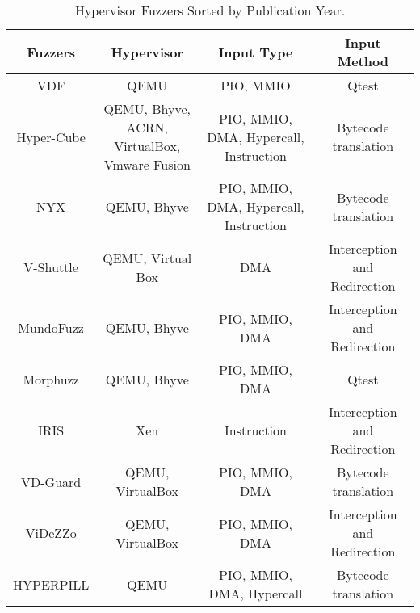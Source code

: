\begin{table}
    \centering
    \scriptsize %
    \caption{Hypervisor Fuzzers Sorted by Publication Year.}
    \label{tab_hypervisor}
    \vspace{-0.3cm}
    \begin{tabular}{cccc}
    \toprule
    Fuzzers & Hypervisor & Input Type & Input Method \\
    \midrule
    VDF\cite{henderson2017vdf} & QEMU & PIO, MMIO & Qtest \\
    Hyper-Cube\cite{schumilo2020hyper} & \makecell{QEMU, Bhyve, ACRN, \\ VirtualBox, Vmware Fusion} & PIO, MMIO, DMA, Hypercall, Instruction & Bytecode translation \\
    NYX\cite{schumilo2021nyx} & QEMU, Bhyve & PIO, MMIO, DMA, Hypercall, Instruction & Bytecode translation \\
    V-Shuttle\cite{pan2021V-shuttle} & QEMU, Virtual Box & DMA & Interception and Redirection \\
    MundoFuzz\cite{myung2022mundofuzz} & QEMU, Bhyve & PIO, MMIO, DMA & Interception and Redirection \\
    Morphuzz\cite{bulekov2022morphuzz} & QEMU, Bhyve & PIO, MMIO, DMA & Qtest \\
    IRIS\cite{cesarano2023iris} & Xen & Instruction & Interception and Redirection \\
    VD-Guard\cite{Liu2023VDGuard} & QEMU, VirtualBox & PIO, MMIO, DMA & Bytecode translation \\
    ViDeZZo\cite{Liu2023ViDeZZoDV} & QEMU, VirtualBox & PIO, MMIO, DMA & Interception and Redirection\\
    HYPERPILL\cite{Bulekov2024HYPERPILLFF} & QEMU & PIO, MMIO, DMA, Hypercall & Bytecode translation\\
    \bottomrule
    \end{tabular}
\end{table}



